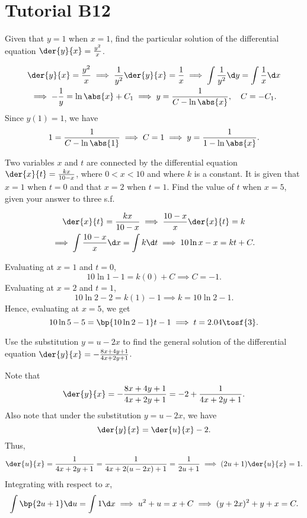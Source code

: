\section{Tutorial B12}

\begin{problem}
    Given that $y = 1$ when $x = 1$, find the particular solution of the differential equation $\der{y}{x} = \frac{y^2}{x}$.
\end{problem}
\begin{solution}
    \begin{gather*}
        \der{y}{x} = \frac{y^2}{x} \implies \frac1{y^2} \der{y}{x} = \frac1x \implies \int \frac1{y^2} \d y = \int \frac1x \d x \\
        \implies -\frac1{y} = \ln \abs{x} + C_1 \implies y = \frac1{C - \ln \abs{x}}, \quad C = -C_1.
    \end{gather*}
    Since $y(1) = 1$, we have \[1 = \frac{1}{C - \ln \abs{1}} \implies C = 1 \implies y = \frac1{1 - \ln \abs{x}}.\]
\end{solution}

\begin{problem}
    Two variables $x$ and $t$ are connected by the differential equation $\der{x}{t} = \frac{kx}{10-x}$, where $0 < x < 10$ and where $k$ is a constant. It is given that $x = 1$ when $t = 0$ and that $x = 2$ when $t = 1$. Find the value of $t$ when $x = 5$, given your answer to three s.f.
\end{problem}
\begin{solution}
    \begin{gather*}
        \der{x}{t} = \frac{kx}{10-x} \implies \frac{10-x}{x} \der{x}{t} = k\\
        \implies \int \frac{10-x}{x} \d x = \int k \d t \implies 10\ln x - x = kt + C.
    \end{gather*}

    Evaluating at $x = 1$ and $t = 0$, \[10\ln{1} - 1 = k(0) + C \implies C = -1.\] Evaluating at $x = 2$ and $t = 1$, \[10\ln{2} - 2 = k(1) - 1 \implies k = 10 \ln 2 - 1.\] Hence, evaluating at $x = 5$, we get \[10\ln{5} - 5 = \bp{10 \ln 2 - 1}t - 1 \implies t = 2.04 \tosf{3}.\]
\end{solution}

\begin{problem}
    Use the substitution $y = u - 2x$ to find the general solution of the differential equation $\der{y}{x} = -\frac{8x + 4y + 1}{4x+2y+1}$.
\end{problem}
\begin{solution}
    Note that \[\der{y}{x} = -\frac{8x + 4y + 1}{4x+2y+1} = -2 + \frac1{4x + 2y + 1}.\] Also note that under the substitution $y = u - 2x$, we have \[\der{y}{x} = \der{u}{x} - 2.\] Thus, \[\der{u}{x} = \frac1{4x + 2y + 1} = \frac1{4x + 2(u - 2x) + 1} = \frac1{2u + 1} \implies (2u + 1) \der{u}{x} = 1.\] Integrating with respect to $x$, \[\int \bp{2u + 1} \d u = \int 1 \d x \implies u^2 + u = x + C \implies (y+2x)^2 + y + x = C.\]
\end{solution}

